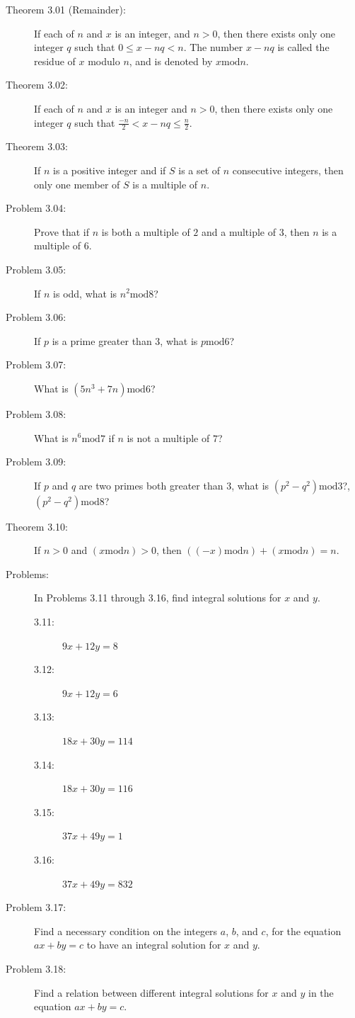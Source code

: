 \documentclass{article}
\begin{document}
\begin{description}

  \item[Theorem 3.01 (Remainder):] If each of $n$ and $x$ is an integer, and $n>0$, then there exists only one integer $q$ such that $0 \leq x-nq < n$. The number $x-nq$ is called the residue of $x$ modulo $n$, and is denoted by $x \text{mod} n$.

  \item[Theorem 3.02:] If each of $n$ and $x$ is an integer and $n>0$, then there exists only one integer $q$ such that $\frac{-n}{2} < x-nq \leq \frac{n}{2}$.

  \item[Theorem 3.03:] If $n$ is a positive integer and if $S$ is a set of $n$ consecutive integers, then only one member of $S$ is a multiple of $n$.

  \item[Problem 3.04:] Prove that if $n$ is both a multiple of $2$ and a multiple of $3$, then $n$ is a multiple of $6$.

  \item[Problem 3.05:] If $n$ is odd, what is $n^2 \text{mod} 8$?

  \item[Problem 3.06:] If $p$ is a prime greater than $3$, what is $p \text{mod} 6$?

  \item[Problem 3.07:] What is $(5n^3+7n) \text{mod} 6$?

  \item[Problem 3.08:] What is $n^6 \text{mod} 7$ if $n$ is not a multiple of $7$?

  \item[Problem 3.09:] If $p$ and $q$ are two primes both greater than $3$, what is $(p^2-q^2) \text{mod} 3$?, $(p^2-q^2) \text{mod} 8$?

  \item[Theorem 3.10:] If $n>0$ and $(x \text{mod} n) > 0$, then $((-x) \text{mod} n) + (x \text{mod} n) = n$.

  \item[Problems:] In Problems 3.11 through 3.16, find integral solutions for $x$ and $y$.
    \begin{description}
      \item[3.11:] $9x+12y=8$
      \item[3.12:] $9x+12y=6$
      \item[3.13:] $18x+30y=114$
      \item[3.14:] $18x+30y=116$
      \item[3.15:] $37x+49y=1$
      \item[3.16:] $37x+49y=832$
    \end{description}

  \item[Problem 3.17:] Find a necessary condition on the integers $a$, $b$, and $c$, for the equation $ax+by=c$ to have an integral solution for $x$ and $y$.

  \item[Problem 3.18:] Find a relation between different integral solutions for $x$ and $y$ in the equation $ax+by=c$.

\end{description}
\end{document}
